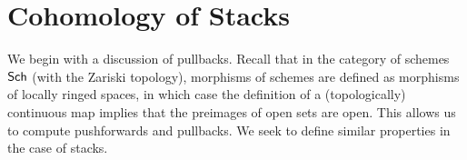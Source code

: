\section{Cohomology of Stacks}\label{sec: cohomology of stacks}
We begin with a discussion of pullbacks. Recall that in the category of schemes $\mathsf{Sch}$ (with the Zariski topology), morphisms of schemes are defined as morphisms of locally ringed spaces, in which case the definition of a (topologically) continuous map implies that the preimages of open sets are open. This allows us to compute pushforwards and pullbacks. We seek to define similar properties in the case of stacks. 